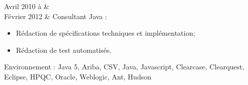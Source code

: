 Avril 2010 à & \\%
Février 2012 & Consultant Java :%
\begin{itemize}%
    \item Rédaction de spécifications techniques et implémentation;%
    \item Rédaction de test automatisés.%
\end{itemize}%
Environnement : Java 5, Ariba, CSV, Java, Javascript, Clearcase, Clearquest, Eclipse, HPQC, Oracle, Weblogic, Ant, Hudson